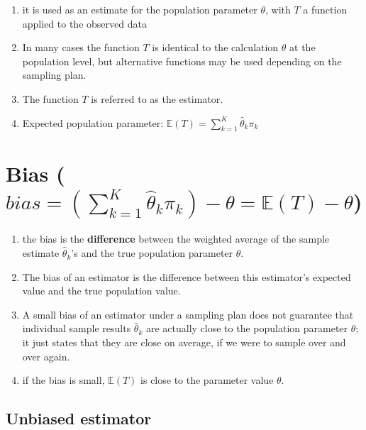 \begin{enumerate}
    \item it is used as an estimate for the population parameter $\theta$, with $T$ a function applied to the observed data

    \item In many cases the function $T$ is identical to the calculation $\theta$ at the population level, but alternative functions may be used depending on the sampling plan.

    \item The function $T$ is referred to as the estimator.

    \item Expected population parameter: $\mathbb{E}(T) = \displaystyle\sum_{k=1}^{K} \hat{\theta}_k\pi_k$
\end{enumerate}


\section{
Bias (${
    bias = ( \sum_{k=1}^{K} \hat{\theta}_k\pi_k )
     - \theta = \mathbb{E}(T) - \theta
}$) 
\cite{ism-1}}\label{sampling plans: Bias}

\begin{enumerate}
    \item the bias is the \textbf{difference} between the weighted average of the sample estimate $\hat{\theta}_k$’s and the true population parameter $\theta$.

    \item The bias of an estimator is the difference between this estimator’s expected value and the true population value.

    \item A small bias of an estimator under a sampling plan does not guarantee that individual sample results $\hat{\theta}_k$ are actually close to the population parameter $\theta$; it just states that they are close on average, if we were to sample over and over again.

    \item if the bias is small, $\mathbb{E}(T)$ is close to the parameter value $\theta$.

    
\end{enumerate}

\subsection{Unbiased estimator} \label{Unbiased estimator}

